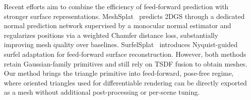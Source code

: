 Recent efforts aim to combine the efficiency of feed-forward prediction with stronger surface representations. MeshSplat~\citep{chang2025meshsplat} predicts 2DGS through a dedicated normal prediction network supervised by a monocular normal estimator and regularizes positions via a weighted Chamfer distance loss, substantially improving mesh quality over baselines. SurfelSplat~\citep{daisurfelsplat} introduces Nyquist-guided surfel adaptation for feed-forward surface reconstruction. However, both methods retain Gaussian-family primitives and still rely on TSDF fusion to obtain meshes. Our method brings the triangle primitive into feed-forward, pose-free regime, where oriented triangles used for differentiable rendering can be directly exported as a mesh without additional post-processing or per-scene tuning.
